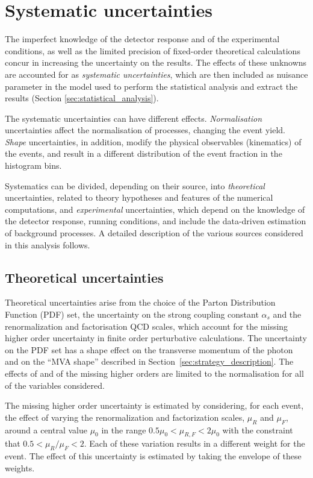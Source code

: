 \section{Systematic uncertainties}
\label{sec:systematics}
The imperfect knowledge of the detector response and of the experimental conditions, as well as the limited precision of fixed-order theoretical calculations concur in increasing the uncertainty on the results.
The effects of these unknowns are accounted for as \textit{systematic uncertainties}, which are then included as nuisance parameter in the model used to perform the statistical analysis and extract the results (Section \ref{sec:statistical_analysis}).

The systematic uncertainties can have different effects.
\textit{Normalisation} uncertainties affect the normalisation of processes, changing the event yield.
\textit{Shape} uncertainties, in addition, modify the physical observables (\eg kinematics) of the events, and result in a different distribution of the event fraction in the histogram bins.

Systematics can be divided, depending on their source, into \textit{theoretical} uncertainties, related to theory hypotheses and features of the numerical computations, and \textit{experimental} uncertainties, which depend on the knowledge of the detector response, running conditions, and include the data-driven estimation of background processes.
A detailed description of the various sources considered in this analysis follows.

\subsection{Theoretical uncertainties}
Theoretical uncertainties arise from the choice of the Parton Distribution Function (PDF) set,
the uncertainty on the strong coupling constant $\alpha_s$ and
the renormalization and factorisation QCD scales, which account for the missing higher order uncertainty in finite order perturbative calculations.
The uncertainty on the PDF set has a shape effect on the transverse momentum of the photon
and on the ``MVA shape'' described in Section~\ref{sec:strategy_description}.
The effects of \alpS and of the missing higher orders are limited to the normalisation for all of the variables considered.

The missing higher order uncertainty is estimated by considering, for each event, the effect
of varying the renormalization and factorization scales, $\mu_R$ and $\mu_F$,
around a central value $\mu_0$ in the range $0.5\mu_0 < \mu_{R,F} < 2\mu_0$
with the constraint that $0.5 < \mu_R/\mu_F < 2$.
Each of these variation results in a different weight for the event.
The effect of this uncertainty is estimated by taking the envelope of these weights.

